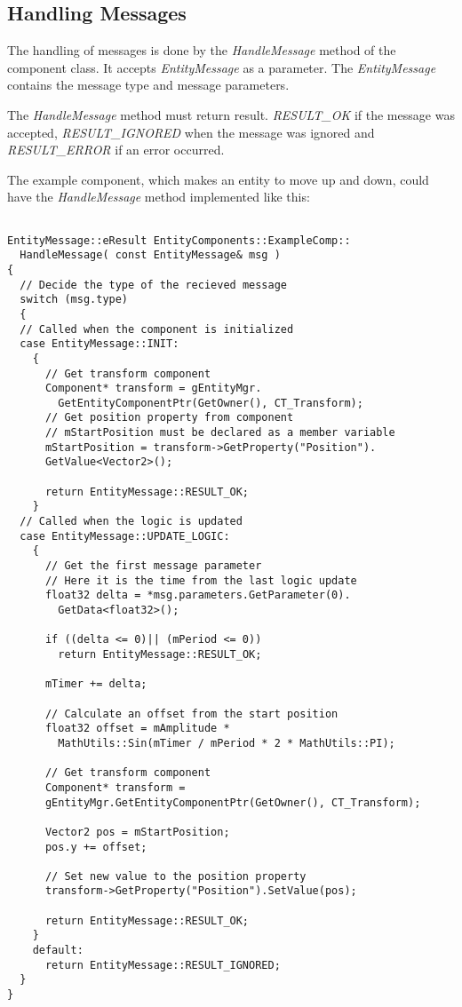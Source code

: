 \documentclass[a4paper, 12pt]{report}
\begin{document}
\subsection{Handling Messages}

 The handling of messages is done by the \emph{HandleMessage} method of the component class. It accepts \emph{EntityMessage} as a parameter. The \emph{EntityMessage} contains the message type and message parameters. 

The \emph{HandleMessage} method must return result. \emph{RESULT\_OK} if the message was accepted, \emph{RESULT\_IGNORED} when the message was ignored and \emph{RESULT\_ERROR} if an error occurred.

The example component, which makes an entity to move up and down, could have the \emph{HandleMessage} method implemented like this:

\footnotesize 
\begin{verbatim}

EntityMessage::eResult EntityComponents::ExampleComp::
  HandleMessage( const EntityMessage& msg )
{
  // Decide the type of the recieved message
  switch (msg.type)
  {
  // Called when the component is initialized
  case EntityMessage::INIT:
    {
      // Get transform component
      Component* transform = gEntityMgr.
        GetEntityComponentPtr(GetOwner(), CT_Transform);
      // Get position property from component
      // mStartPosition must be declared as a member variable
      mStartPosition = transform->GetProperty("Position").
      GetValue<Vector2>();

      return EntityMessage::RESULT_OK;
    }
  // Called when the logic is updated
  case EntityMessage::UPDATE_LOGIC:
    {
      // Get the first message parameter
      // Here it is the time from the last logic update
      float32 delta = *msg.parameters.GetParameter(0).
        GetData<float32>();

      if ((delta <= 0)|| (mPeriod <= 0))
        return EntityMessage::RESULT_OK;

      mTimer += delta;

      // Calculate an offset from the start position
      float32 offset = mAmplitude * 
        MathUtils::Sin(mTimer / mPeriod * 2 * MathUtils::PI);

      // Get transform component
      Component* transform = 
      gEntityMgr.GetEntityComponentPtr(GetOwner(), CT_Transform);

      Vector2 pos = mStartPosition;
      pos.y += offset;

      // Set new value to the position property
      transform->GetProperty("Position").SetValue(pos);

      return EntityMessage::RESULT_OK;
    }
    default:
      return EntityMessage::RESULT_IGNORED;
  }
}
\end{verbatim}
\normalsize
\end{document}
